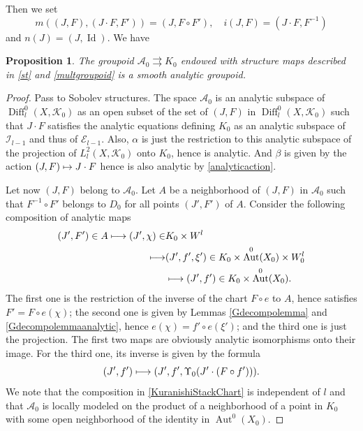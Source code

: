 \documentclass[JEP,XML,SOM,Unicode]{cedram}
\let\mathcal\mathscr
\def\mto{\mathchoice{\longmapsto}{\mapsto}{\mapsto}{\mapsto}}
\DeclareMathOperator{\Aut}{Aut}
\DeclareMathOperator{\Diff}{Diff}
\DeclareMathOperator{\Id}{Id}
\theoremstyle{plain}
\newtheorem{proposition}[theorem]{Proposition}
\theoremstyle{definition}
\theoremstyle{remark}
\numberwithin{equation}{section}
\newcommand{\Azero}{\Aut^0(X_0)}
\newcommand{\DlKz}{\Diff^0_l(X,\mathcal K_0)}
\newcommand{\cI}{\mathcal{I}}
\begin{document}
Then we set
\begin{equation}
\label{multgroupoid}
m((J,F),(J\cdot F, F'))=(J,F\circ F'),\quad i(J,F)=(J\cdot F, F^{-1})
\end{equation}
and $n(J)=(J,\Id)$.
We have
\begin{proposition}
\label{analyticKurstack}
The groupoid $\mathcal A_0\rightrightarrows K_0$ endowed with structure maps described in \eqref{st} and \eqref{multgroupoid} is a smooth analytic groupoid.
\end{proposition}
\begin{proof}
Pass to Sobolev structures. The space $\mathcal A_0$ is an analytic subspace of $\DlKz$ as an open subset of the set of $(J,F)$ in $\DlKz$ such that $J\cdot F$ satisfies the analytic equations defining $K_0$ as an analytic subspace of $\cI_{l-1}$ and thus of $\mathcal E_{l-1}$. Also, $\alpha$ is just the restriction to this analytic subspace of the projection of $L^2_l(X,\mathcal K_0)$ onto $K_0$, hence is analytic. And $\beta$ is given by the action $(J,F)\mto J\cdot F$ hence is also analytic by \eqref{analyticaction}.

Let now $(J,F)$ belong to $\mathcal A_0$. Let $A$ be a neighborhood of $(J,F)$ in $\mathcal A_0$ such that $F^{-1}\circ F'$ belongs to $D_0$ for all points $(J',F')$ of $A$. Consider the following composition of analytic maps
\begin{equation}
\label{KuranishiStackChart}
\begin{split}
(J',F')\in A\mto (J',\chi)\in &K_0\times W^l\\\mto &(J',f',\xi')\in K_0\times \Azero\times W_0^l\\&\mto (J',f')\in K_0\times\Azero.
\end{split}
\end{equation}
The first one is the restriction of the inverse of the chart $F\circ e$ to $A$, hence satisfies $F'=F\circ e(\chi)$; the second one is given by Lemmas \ref{Gdecompolemma} and \ref{Gdecompolemmaanalytic}, hence $e(\chi)=f'\circ e(\xi')$; and the third one is just the projection. The first two maps are obviously analytic isomorphisms onto their image. For the third one, its inverse is given by the formula
\begin{equation}
\label{inverseKuranishiStackChart}
(J',f')\mto (J',f',\Upsilon_0(J'\cdot (F\circ f'))).
\end{equation}
We note that the composition in \eqref{KuranishiStackChart} is independent of $l$ and that $\mathcal A_0$ is locally modeled on the product of a neighborhood of a point in $K_0$ with some open neighborhood of the identity in $\Azero$.


\end{proof}
\end{document}
